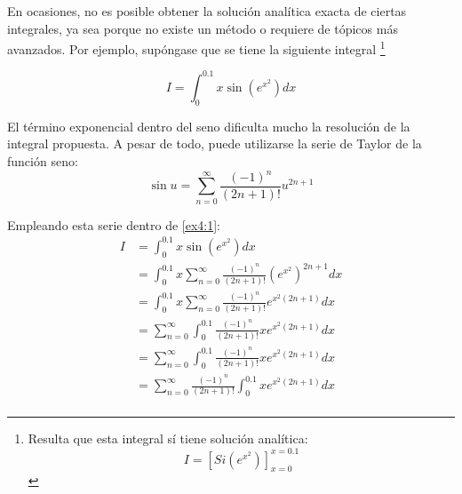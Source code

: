 \begin{ex}

    En ocasiones, no es posible obtener la solución analítica exacta de
    ciertas integrales, ya sea porque no existe un método o requiere de
    tópicos más avanzados. Por ejemplo, supóngase que se tiene la siguiente
    integral \footnote{
        Resulta que esta integral sí tiene solución
        analítica: 
        \[
            I = \left[Si(e^{x^2})\right]_{x=0}^{x=0.1}
        \]
    }

    \begin{equation}\label{ex4:1}
        I = \int_{0}^{0.1} x \sin(e^{x^2}) dx
    \end{equation}

    \begin{solution}

        El término exponencial dentro del seno dificulta mucho la resolución de
        la integral propuesta. A pesar de todo, puede utilizarse la serie de
        Taylor de la función seno:
        \[
            \sin u = \sum_{n = 0}^{\infty} \frac{(-1)^n}{(2n + 1)!} u^{2n +
            1}
        \]

        Empleando esta serie dentro de \ref{ex4:1}:
        \begin{align*}
            I &= \int_{0}^{0.1} x \sin(e^{x^2}) dx \\
              &= \int_{0}^{0.1} x \sum_{n = 0}^{\infty} \frac{(-1)^n}{(2n +
              1)!} (e^{x^2})^{2n + 1} dx \\
              &= \int_{0}^{0.1} x \sum_{n = 0}^{\infty} \frac{(-1)^n}{(2n +
              1)!} e^{x^2(2n + 1)} dx \\
              &= \sum_{n = 0}^{\infty} \int_{0}^{0.1} \frac{(-1)^n}{(2n +
              1)!} x e^{x^2(2n + 1)} dx \\
              &= \sum_{n = 0}^{\infty} \int_{0}^{0.1} \frac{(-1)^n}{(2n +
              1)!} x e^{x^2(2n + 1)} dx \\
              &= \sum_{n = 0}^{\infty} \frac{(-1)^n}{(2n + 1)!}
              \int_{0}^{0.1} x e^{x^2(2n + 1)} dx \\
        \end{align*}


\end{solution}
\end{ex}
